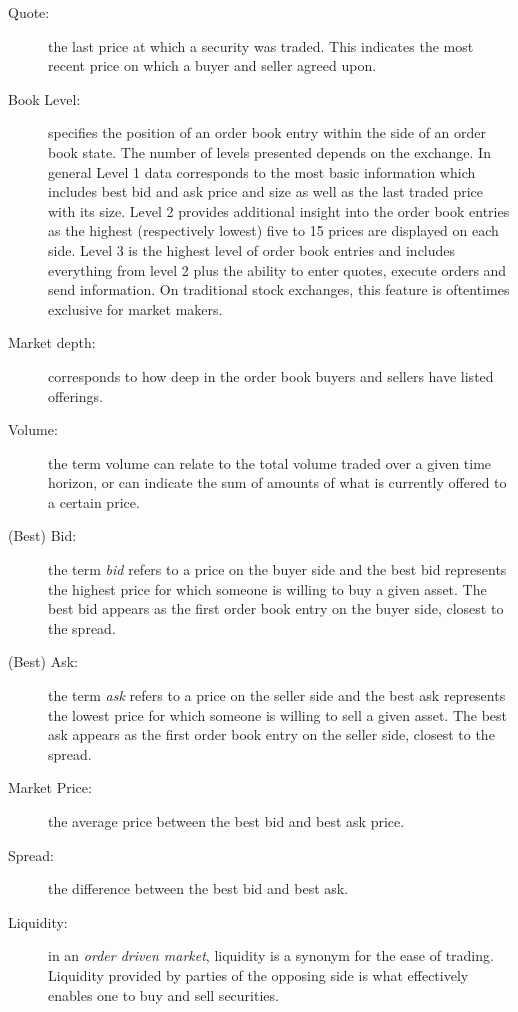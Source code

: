 \begin{description}
    \item[Quote:] the last price at which a security was traded.
    This indicates the most recent price on which a buyer and seller agreed upon.

    \item[Book Level:] specifies the position of an order book entry within the side of an order book state. 
    The number of levels presented depends on the exchange. 
    In general Level 1 data corresponds to the most basic information which includes best bid and ask price and size as well as the last traded price with its size.
    Level 2 provides additional insight into the order book entries as the highest (respectively lowest) five to 15 prices are displayed on each side.
    Level 3 is the highest level of order book entries and includes everything from level 2 plus the ability to enter quotes, execute orders and send information. On traditional stock exchanges, this feature is oftentimes exclusive for market makers. \cite{trading-levels}
    
    \item[Market depth:] corresponds to how deep in the order book buyers and sellers have listed offerings.
    
    \item[Volume:] the term volume can relate to the total volume traded over a given time horizon, or can indicate the sum of amounts of what is currently offered to a certain price.
    
    \item[(Best) Bid:] the term \textit{bid} refers to a price on the buyer side and the best bid represents the highest price for which someone is willing to buy a given asset. 
    The best bid appears as the first order book entry on the buyer side, closest to the spread.
    \item[(Best) Ask:] the term \textit{ask} refers to a price on the seller side and the best ask represents the lowest price for which someone is willing to sell a given asset. 
    The best ask appears as the first order book entry on the seller side, closest to the spread.
    \item[Market Price:] the average price between the best bid and best ask price.
    
    \item[Spread:] the difference between the best bid and best ask.
    
    \item[Liquidity:] in an \textit{order driven market}, liquidity is a synonym for the ease of trading.
    Liquidity provided by parties of the opposing side is what effectively enables one to buy and sell securities.
    

\end{description}
